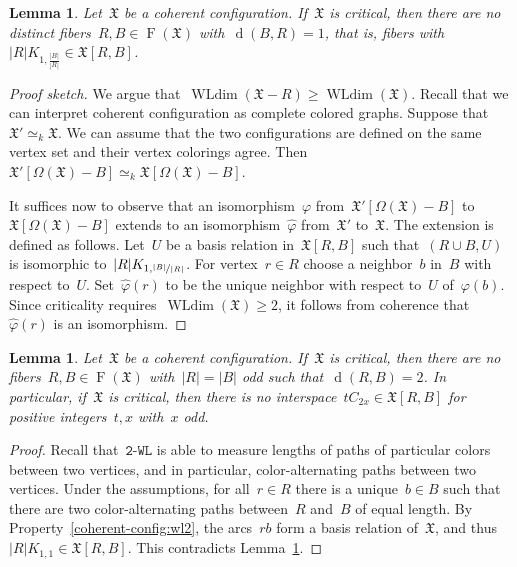 \documentclass[english,a4paper]{article}
\theoremstyle{plain}
\newtheorem{lemma}      [theorem]{Lemma}
\theoremstyle{definition}
\newcommand{\abs}[1]{| #1 |}
\DeclareMathOperator{\Fibers}{F}
\newcommand{\coherentConfig}{\ensuremath{\mathfrak{X}}}
\newcommand{\fibers}[1]{\ensuremath{\Fibers \left( #1 \right)}}
\newcommand{\interspace}[2]{\ensuremath{\coherentConfig[#1,#2]}}
\newcommand{\minimalDegree}[2]{\Deg(#1,#2)}
\newcommand{\vertices}{\ensuremath{\Omega}}
\DeclareMathOperator*{\WLdim}{WLdim}
\newcommand{\wldim}[1]{\ensuremath{\WLdim\left(#1\right)}}
\newcommand{\wld}[1]{\texttt{#1-WL}}
\newcommand{\wltwo}{\wld{2}\xspace}
\DeclareMathOperator{\Deg}{d}
\newcommand{\clique}[1]{\ensuremath{K_{#1}}}
\newcommand{\cycle}[1]{\ensuremath{C_{#1}}}
\newcommand{\disjointCliques}[2]{\ensuremath{#1 \clique{#2}}}
\newcommand{\disjointCycles}[2]{\ensuremath{#1 \cycle{#2}}}
\begin{document}
\begin{lemma}
\label{critical:star/lem}
    Let~$\coherentConfig$ be a coherent configuration.
    If~$\coherentConfig$ is critical, then there are no distinct fibers~$R,B \in \fibers{\coherentConfig}$ with~$\minimalDegree{B}{R}=1$, that is, fibers with~$\disjointCliques{\abs{R}}{1,\frac{\abs{B}}{\abs{R}}} \in \interspace{R}{B}$.
\end{lemma}
\begin{proof}[Proof sketch]
    We argue that~$\wldim{\coherentConfig-R} \geq \wldim{\coherentConfig}$.
    Recall that we can interpret coherent configuration as complete colored graphs.
    Suppose that~$\coherentConfig' \simeq_k \coherentConfig$.
    We can assume that the two configurations are defined on the same vertex set and their vertex colorings agree.
    Then~$\coherentConfig'[\vertices(\coherentConfig)-B] \simeq_k  \coherentConfig[\vertices(\coherentConfig)-B]$.

    It suffices now to observe that an isomorphism~$\varphi$ from~$\coherentConfig'[\vertices(\coherentConfig)-B]$ to~$\coherentConfig[\vertices(\coherentConfig)-B]$ extends to an isomorphism~$\widehat{\varphi}$ from~$\coherentConfig'$ to~$\coherentConfig$. The extension is defined as follows.
    Let~$U$ be a basis relation in~$\interspace{R}{B}$ such that~$(R \cup B, U)$ is isomorphic to~$\disjointCliques{\abs{R}}{1,\nicefrac{|B|}{|R|}}$.
    For vertex~$r\in R$ choose a neighbor~$b$ in~$B$ with respect to~$U$.
    Set~$\widehat{\varphi}(r)$ to be the unique neighbor with respect to~$U$ of~$\varphi(b)$. Since criticality requires~$\wldim{\coherentConfig}\geq 2$, it follows from coherence that~$\widehat{\varphi}(r)$ is an isomorphism.
\end{proof}


\begin{lemma}
\label{critical:cycle/lem}
    Let~$\coherentConfig$ be a coherent configuration.
    If~$\coherentConfig$ is critical, then there are no fibers~$R,B\in \fibers{\coherentConfig}$ with~$|R|=|B|$ odd such that~$\minimalDegree{R}{B}=2$.
    In particular, if~$\coherentConfig$ is critical, then there is no interspace~$\disjointCycles{t}{2x} \in \interspace{R}{B}$ for positive integers~$t,x$ with~$x$ odd.
\end{lemma}
\begin{proof}
    Recall that~$\wltwo$ is able to measure lengths of paths of particular colors between two vertices, and in particular, color-alternating paths between two vertices. Under the assumptions, for all~$r \in R$ there is a unique~$b \in B$ such that there are two color-alternating paths between~$R$ and~$B$ of equal length.
    By Property~\ref{coherent-config:wl2}, the arcs~$rb$ form a basis relation of~$\coherentConfig$, and thus~$\disjointCliques{\abs{R}}{1,1} \in \interspace{R}{B}$.
    This contradicts Lemma~\ref{critical:star/lem}.
\end{proof}
\end{document}
